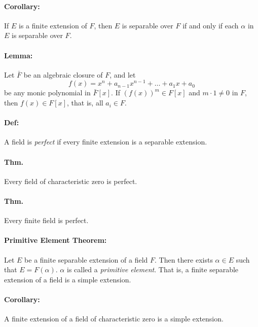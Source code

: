 \documentclass[10pt,a4paper]{article}
\begin{document}
\paragraph{Corollary:} If $E$ is a finite extension of $F$, then $E$ is separable over $F$ if and only if each $\alpha$ in $E$ is separable over $F$. 

\paragraph{Lemma:} Let $\bar{F}$ be an algebraic closure of $F$, and let
$$ f(x) = x^n+a_{n-1}x^{n-1}+ \dots + a_1x + a_0$$
be any monic polynomial in $\bar{F}[x]$. If $(f(x))^m \in F[x]$ and $m \cdot 1 \neq 0$ in $F$, then $f(x) \in F[x]$, that is, all $a_i \in F$.

\paragraph{Def:} A field is \textit{perfect} if every finite extension is a separable extension.

\paragraph{Thm.} Every field of characteristic zero is perfect.

\paragraph{Thm.} Every finite field is perfect.

\paragraph{Primitive Element Theorem:} Let $E$ be a finite separable extension of a field $F$. Then there exists $\alpha \in E$ such that $E = F(\alpha)$. $\alpha$ is called a \textit{primitive element}. That is, a finite separable extension of a field is a simple extension.

\paragraph{Corollary:} A finite extension of a field of characteristic zero is a simple extension.
\end{document}
